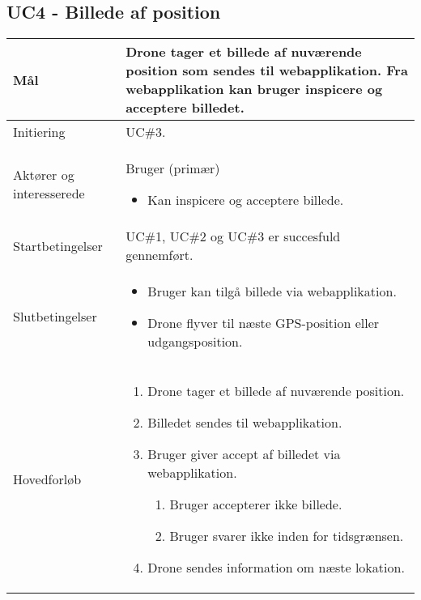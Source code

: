 \subsection*{UC4 - Billede af position}

\begin{table}[H]
\begin{tabular}{| p{3cm}| p{11.5cm}|}
\hline

Mål	 							& Drone tager et billede af nuværende position som sendes til webapplikation. Fra webapplikation kan bruger inspicere og acceptere billedet. \\\hline
Initiering 							& UC\#3. \\\hline
Aktører og \newline interesserede			& Bruger (primær) 
										\begin{itemize}
											\item Kan inspicere og acceptere billede.
										\end{itemize} \\ \hline
										
Startbetingelser					& UC\#1, UC\#2 og UC\#3 er succesfuld gennemført. \\\hline
Slutbetingelser						& 	\begin{itemize}
											\item Bruger kan tilgå billede via webapplikation.
											\item Drone flyver til næste GPS-position eller udgangsposition.
										\end{itemize} \\\hline
Hovedforløb				&
 
									\renewcommand{\labelenumi}{\arabic{enumi}.}
									\renewcommand{\labelenumii}{\Roman{enumii}:}

									\begin{enumerate}[topsep=0.0cm, leftmargin=0.5cm]
										\item Drone tager et billede af nuværende position.
										\item Billedet sendes til webapplikation.
										\item Bruger giver accept af billedet via webapplikation.
											\begin{enumerate}[partopsep=4cm, topsep=0cm, leftmargin=1cm]
												\item Bruger accepterer ikke billede.
												\item Bruger svarer ikke inden for tidsgrænsen.
											\end{enumerate}
										\item Drone sendes information om næste lokation.
									\end{enumerate} \\\hline	


\end{tabular}
\end{table}
